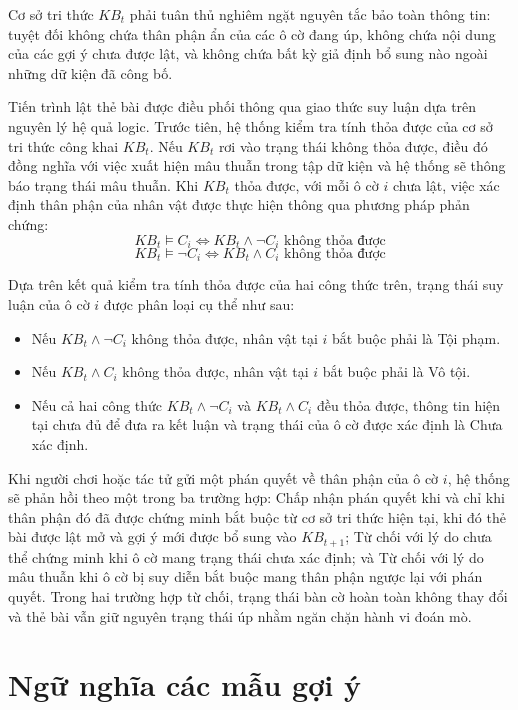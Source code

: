 Cơ sở tri thức $KB_t$ phải tuân thủ nghiêm ngặt nguyên tắc bảo toàn thông tin: tuyệt đối không chứa thân phận ẩn của các ô cờ đang úp, không chứa nội dung của các gợi ý chưa được lật, và không chứa bất kỳ giả định bổ sung nào ngoài những dữ kiện đã công bố.

Tiến trình lật thẻ bài được điều phối thông qua giao thức suy luận dựa trên nguyên lý hệ quả logic. Trước tiên, hệ thống kiểm tra tính thỏa được của cơ sở tri thức công khai $KB_t$. Nếu $KB_t$ rơi vào trạng thái không thỏa được, điều đó đồng nghĩa với việc xuất hiện mâu thuẫn trong tập dữ kiện và hệ thống sẽ thông báo trạng thái mâu thuẫn. Khi $KB_t$ thỏa được, với mỗi ô cờ $i$ chưa lật, việc xác định thân phận của nhân vật được thực hiện thông qua phương pháp phản chứng:
\[
KB_t \models C_i \iff KB_t \land \neg C_i \text{ không thỏa được}
\]
\[
KB_t \models \neg C_i \iff KB_t \land C_i \text{ không thỏa được}
\]

Dựa trên kết quả kiểm tra tính thỏa được của hai công thức trên, trạng thái suy luận của ô cờ $i$ được phân loại cụ thể như sau:
\begin{itemize}
    \item Nếu $KB_t \land \neg C_i$ không thỏa được, nhân vật tại $i$ bắt buộc phải là Tội phạm.
    \item Nếu $KB_t \land C_i$ không thỏa được, nhân vật tại $i$ bắt buộc phải là Vô tội.
    \item Nếu cả hai công thức $KB_t \land \neg C_i$ và $KB_t \land C_i$ đều thỏa được, thông tin hiện tại chưa đủ để đưa ra kết luận và trạng thái của ô cờ được xác định là Chưa xác định.
\end{itemize}

Khi người chơi hoặc tác tử gửi một phán quyết về thân phận của ô cờ $i$, hệ thống sẽ phản hồi theo một trong ba trường hợp: Chấp nhận phán quyết khi và chỉ khi thân phận đó đã được chứng minh bắt buộc từ cơ sở tri thức hiện tại, khi đó thẻ bài được lật mở và gợi ý mới được bổ sung vào $KB_{t+1}$; Từ chối với lý do chưa thể chứng minh khi ô cờ mang trạng thái chưa xác định; và Từ chối với lý do mâu thuẫn khi ô cờ bị suy diễn bắt buộc mang thân phận ngược lại với phán quyết. Trong hai trường hợp từ chối, trạng thái bàn cờ hoàn toàn không thay đổi và thẻ bài vẫn giữ nguyên trạng thái úp nhằm ngăn chặn hành vi đoán mò.

\section{Ngữ nghĩa các mẫu gợi ý}
\label{sec:ngu-nghia-goi-y}

